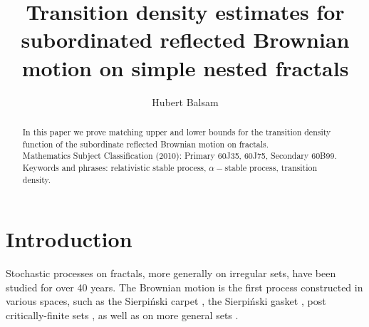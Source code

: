 \documentclass[11pt]{article}
\title{Transition density estimates for subordinated reflected Brownian motion on simple nested fractals}
\author{Hubert Balsam}
\begin{document}
\newcommand{\rd}{\mathbb{R}^d}
\newcommand{\dist}{\emph{dist}}
\newcommand{\tr}{\mbox{tr}}
\newtheorem{theo}{\bf Theorem}[section]
\newtheorem{coro}{\bf Corollary}[section]
\newtheorem{lem}{\bf Lemma}[section]
\newtheorem{rem}{\bf Remark}[section]
\newtheorem{defi}{\bf Definition}[section]
\newtheorem{exam}{\bf Example}[section]
\newtheorem{fact}{\bf Fact}[section]
\newtheorem{prop}{\bf Proposition}[section]
\newtheorem{oq}{\bf Open question}



\maketitle


\begin{abstract}
In this paper we prove matching upper and lower  bounds for the transition density function of the subordinate reflected Brownian motion on  fractals.\\
Mathematics Subject Classification (2010): Primary 60J35, 60J75, Secondary 60B99.\\
Keywords and phrases: relativistic stable process, $\alpha-$stable process, transition density.
\end{abstract}



\section{Introduction}

Stochastic processes on fractals, more generally on irregular sets, have been studied for over 40 years. The Brownian motion is the first process constructed in various spaces, such as the Sierpi\'{n}ski carpet \cite{bib:Bar-Bas}, the Sierpi\'{n}ski gasket \cite{bib:Bar-Per}, post critically-finite sets \cite{bib:Kum}, as well as on more general sets \cite{bib:Stu, bib:Lin,bib:Kum,bib:Fuk1}.
\end{document}
